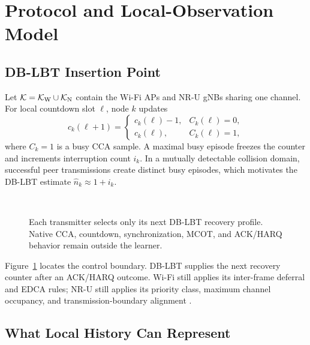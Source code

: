 \section{Protocol and Local-Observation Model}
\label{sec:model}

\subsection{DB-LBT Insertion Point}

Let $\mathcal K=\mathcal K_{\rm W}\cup\mathcal K_{\rm N}$ contain the Wi-Fi
APs and NR-U gNBs sharing one channel. For local countdown slot $\ell$, node
$k$ updates
\begin{equation}
c_k(\ell+1)=
\begin{cases}
c_k(\ell)-1, & C_k(\ell)=0,\\
c_k(\ell), & C_k(\ell)=1,
\end{cases}
\label{eq:countdown}
\end{equation}
where $C_k=1$ is a busy CCA sample. A maximal busy episode freezes the
counter and increments interruption count $i_k$. In a mutually detectable
collision domain, successful peer transmissions create distinct busy episodes,
which motivates the DB-LBT estimate $\hat n_k\approx 1+i_k$.

\begin{figure}[!t]
  \centering
  \\[-1mm]
  \caption{Each transmitter selects only its next DB-LBT recovery profile.
  Native CCA, countdown, synchronization, MCOT, and ACK/HARQ behavior remain
  outside the learner.}
  \label{fig:protocol}
\end{figure}

Figure~\ref{fig:protocol} locates the control boundary. DB-LBT supplies the
next recovery counter after an ACK/HARQ outcome. Wi-Fi still applies its
inter-frame deferral and EDCA rules; NR-U still applies its priority class,
maximum channel occupancy, and transmission-boundary alignment
\cite{kosek2021downlink,3gpp37213}.

\subsection{What Local History Can Represent}

